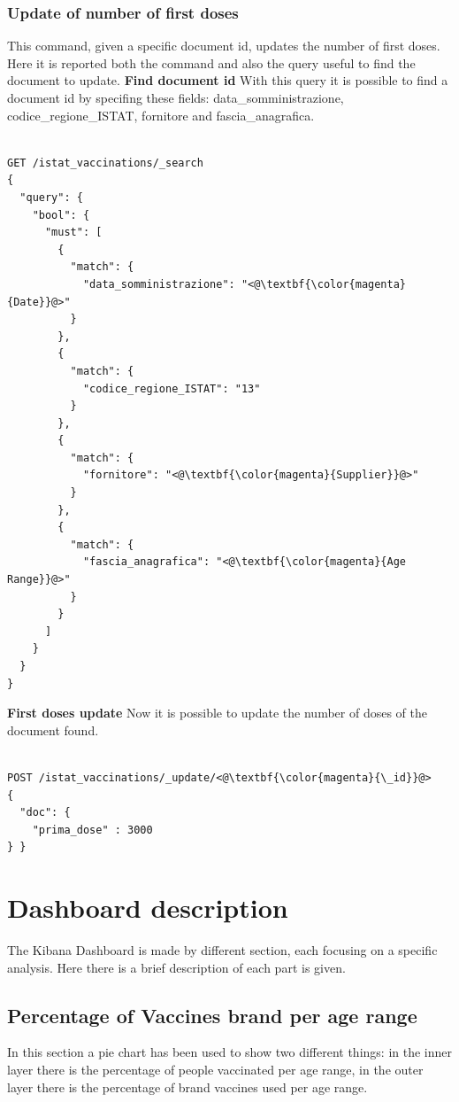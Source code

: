 \documentclass{article}
\begin{document}
\subsubsection{Update of number of first doses}
This command, given a specific document id, updates the number of first doses. Here it is reported both the command and also the query useful to find the document to update.
\hfill\break
\hfill\break
\textbf{Find document id}
\hfill\break
With this query it is possible to find a document id by specifing these fields: data\_somministrazione, codice\_regione\_ISTAT, fornitore and fascia\_anagrafica.

\begin{lstlisting}[language=cypher, label=lst:cypher-example]

GET /istat_vaccinations/_search
{
  "query": {
    "bool": {
      "must": [
        {
          "match": {
            "data_somministrazione": "<@\textbf{\color{magenta}{Date}}@>"
          }
        },
        {
          "match": {
            "codice_regione_ISTAT": "13"
          }
        },
        {
          "match": {
            "fornitore": "<@\textbf{\color{magenta}{Supplier}}@>"
          }
        },
        {
          "match": {
            "fascia_anagrafica": "<@\textbf{\color{magenta}{Age Range}}@>"
          }
        }
      ]
    }
  }
}
\end{lstlisting}
\hfill\break
\textbf{First doses update}
\hfill\break
Now it is possible to update the number of doses of the document found.

\begin{lstlisting}[language=cypher, label=lst:cypher-example]

POST /istat_vaccinations/_update/<@\textbf{\color{magenta}{\_id}}@>
{
  "doc": {
    "prima_dose" : 3000
} }

\end{lstlisting}
\newpage

\section{Dashboard description}
The Kibana Dashboard is made by different section, each focusing on a specific analysis.
Here there is a brief description of each part is given.

\subsection{Percentage of Vaccines brand per age range}
In this section a pie chart has been used to show two different things: in the inner layer there is the percentage of people vaccinated per age range, in the outer layer there is the percentage of brand vaccines used per age range.
\end{document}
